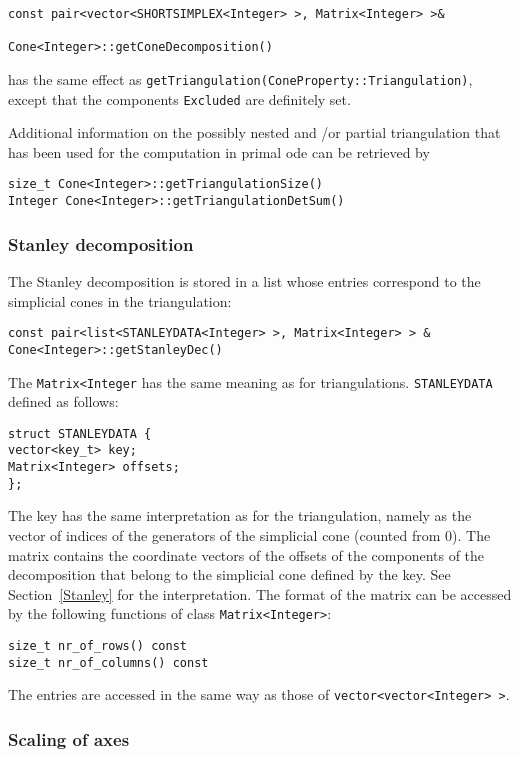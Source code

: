 \documentclass[12pt,a4paper]{scrartcl}
\theoremstyle{definition}
\begin{document}
\begin{small}
\begin{Verbatim}
const pair<vector<SHORTSIMPLEX<Integer> >, Matrix<Integer> >&
                                           Cone<Integer>::getConeDecomposition()
\end{Verbatim}
has the same effect as \verb|getTriangulation(ConeProperty::Triangulation)|, except that the components \verb|Excluded| are definitely set.

Additional information on the possibly nested and /or partial triangulation that has been used for the computation in primal ode can be retrieved by
\begin{Verbatim}
size_t Cone<Integer>::getTriangulationSize()
Integer Cone<Integer>::getTriangulationDetSum() 
\end{Verbatim}

\subsubsection{Stanley decomposition}

The Stanley decomposition is stored in a list whose entries correspond to the simplicial cones in the triangulation:
\begin{Verbatim}
const pair<list<STANLEYDATA<Integer> >, Matrix<Integer> > &  Cone<Integer>::getStanleyDec()
\end{Verbatim}
The \verb|Matrix<Integer| has the same meaning as for triangulations.
\verb|STANLEYDATA| defined as follows:
\begin{Verbatim}
struct STANLEYDATA {
vector<key_t> key;
Matrix<Integer> offsets;
};
\end{Verbatim}
The key has the same interpretation as for the triangulation, namely as the vector of indices of the generators of the simplicial cone (counted from $0$). The matrix contains the coordinate vectors of the offsets of the components of the decomposition that belong to the simplicial cone defined by the key. See Section~\ref{Stanley} for the interpretation. The format of the matrix can be accessed by the following functions of class \verb|Matrix<Integer>|:
\begin{Verbatim}
size_t nr_of_rows() const
size_t nr_of_columns() const
\end{Verbatim}
The entries are accessed in the same way as those of \verb|vector<vector<Integer> >|.

\subsubsection{Scaling of axes}


\end{small}
\end{document}
